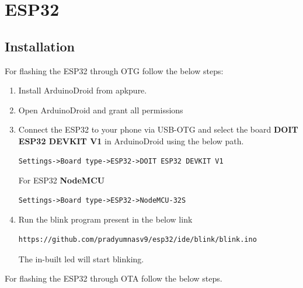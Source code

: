 \documentclass[journal]{IEEEtran}
\begin{document}

\onecolumn


\newpage
\onecolumn

\section{ESP32}
\subsection{Installation}
For flashing the ESP32 through OTG follow the below steps:
\begin{enumerate}
	\item Install ArduinoDroid from apkpure.
	\item Open ArduinoDroid and grant all permissions
	\item Connect the ESP32 to your phone via USB-OTG and select the board \textbf{DOIT ESP32 DEVKIT V1} in ArduinoDroid using the below path.
	\begin{lstlisting}
Settings->Board type->ESP32->DOIT ESP32 DEVKIT V1
	\end{lstlisting}
	For ESP32 \textbf{NodeMCU}
	\begin{lstlisting}
Settings->Board type->ESP32->NodeMCU-32S
	\end{lstlisting}
	\item Run the blink program present in the below link
	\begin{lstlisting}
https://github.com/pradyumnasv9/esp32/ide/blink/blink.ino
	\end{lstlisting}
	The in-built led will start blinking.\\
\end{enumerate}
For flashing the ESP32 through OTA follow the below steps. 
\end{document}
